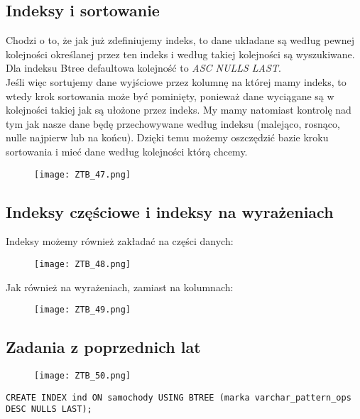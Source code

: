 \documentclass[a4paper,15pt]{article}
\newcommand{\egz}[2]{
    \begin{tcolorbox}[colback=mRed!5!white,colframe=mRed,title={Egzamin #1}]
        #2
    \end{tcolorbox}
}
\newcommand{\example}[2]{
    \begin{tcolorbox}[colback=blue!5!white,colframe=blue,title={Przykład #1}]
        #2
    \end{tcolorbox}
}
\begin{document}
\subsection{Indeksy i sortowanie}
Chodzi o to, że jak już zdefiniujemy indeks, to dane układane są według pewnej kolejności określanej przez ten indeks i według takiej kolejności są wyszukiwane. Dla indeksu Btree defaultowa kolejność to \textit{ASC NULLS LAST}. \\

Jeśli więc sortujemy dane wyjściowe przez kolumnę na której mamy indeks, to wtedy krok sortowania może być pominięty, ponieważ dane wyciągane są w kolejności takiej jak są ułożone przez indeks. My mamy natomiast kontrolę nad tym jak nasze dane będę przechowywane według indeksu (malejąco, rosnąco, nulle najpierw lub na końcu). Dzięki temu możemy oszczędzić bazie kroku sortowania i mieć dane według kolejności którą chcemy.

\example{}{
\begin{figure}[H]
\centering
  \texttt{[image: ZTB\_47.png]}
\end{figure}
}

\subsection{Indeksy częściowe i indeksy na wyrażeniach}

Indeksy możemy również zakładać na części danych:

\example{}{
\begin{figure}[H]
\centering
  \texttt{[image: ZTB\_48.png]}
\end{figure}
}

Jak również na wyrażeniach, zamiast na kolumnach:
\example{}{
\begin{figure}[H]
\centering
  \texttt{[image: ZTB\_49.png]}
\end{figure}
}


\subsection{Zadania z poprzednich lat}

\egz{}{
\begin{figure}[H]
\centering
  \texttt{[image: ZTB\_50.png]}
\end{figure}
}

\begin{lstlisting}
CREATE INDEX ind ON samochody USING BTREE (marka varchar_pattern_ops DESC NULLS LAST);
\end{lstlisting}
\end{document}
